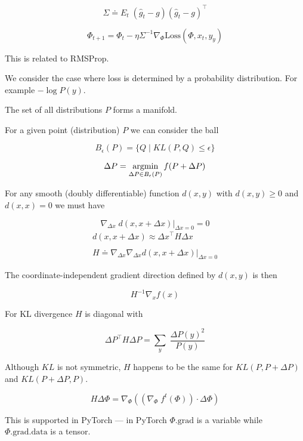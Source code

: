 {

$$\Sigma \doteq E_t \;(\hat{g}_t - g)(\hat{g}_t - g)^\top$$

\vfill
$$\Phi_{t+1} = \Phi_t - \eta \Sigma^{-1} \nabla_\Phi \mathrm{Loss}(\Phi,x_t,y_y)$$

\vfill
This is related to RMSProp.


We consider the case where loss is determined by a probability distribution.  For example $- \log P(y)$.

\vfill
The set of all distributions $P$ forms a manifold.

\vfill
For a given point (distribution) $P$ we can consider the ball

\vfill
$$B_\epsilon(P) = \{Q \;|\; KL(P,Q) \leq \epsilon\}$$

$$\Delta P = \operatorname*{argmin}_{\Delta P \in B_\epsilon(P)} f(P + \Delta P)$$


\vfill
For any smooth (doubly differentiable) function $d(x,y)$ with $d(x,y) \geq 0$ and $d(x,x) = 0$
we must have

\vfill
$$\nabla_{\Delta x} \;d(x,x+ \Delta x)|_{\Delta x = 0} = 0$$
\begin{eqnarray*}
d(x,x + \Delta x) \approx \Delta x^\top H \Delta x \\
\\
H \doteq \nabla_{\Delta x} \nabla_{\Delta x} d(x,x+\Delta x)|_{\Delta x = 0}
\end{eqnarray*}

\vfill
The coordinate-independent gradient direction defined by $d(x,y)$ is then

\vfill
$$H^{-1} \nabla _x f(x)$$


\vfill
For KL divergence $H$ is diagonal with

$$\Delta P^\top H \Delta P = \sum_{y} \; \frac{\Delta P(y)^2}{P(y)}$$

\vfill
Although $KL$ is not symmetric, $H$ happens to be the same for $KL(P,P+\Delta P)$ and $KL(P+\Delta P,P)$.



$$H \Delta \Phi = \nabla_\Phi \left((\nabla_\Phi\; f^t(\Phi))\cdot \Delta \Phi\right)$$

\vfill
This is supported in PyTorch --- in PyTorch $\Phi.\mathrm{grad}$ is a variable while $\Phi.\mathrm{grad}.\mathrm{data}$ is a tensor.

}
